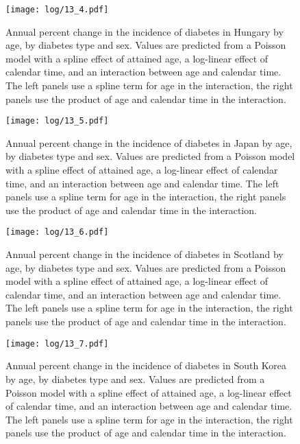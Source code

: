 \documentclass[11pt]{article}
\begin{document}
\begin{figure}
    \centering
    \texttt{[image: log/13\_4.pdf]}
    \caption{Annual percent change in the incidence of diabetes in Hungary by age, by diabetes type and sex. Values are predicted from a Poisson model with a spline effect of attained age, a log-linear effect of calendar time, and an interaction between age and calendar time. The left panels use a spline term for age in the interaction, the right panels use the product of age and calendar time in the interaction.}
    \label{Hungary apcageg}
\end{figure}
\begin{figure}
    \centering
    \texttt{[image: log/13\_5.pdf]}
    \caption{Annual percent change in the incidence of diabetes in Japan by age, by diabetes type and sex. Values are predicted from a Poisson model with a spline effect of attained age, a log-linear effect of calendar time, and an interaction between age and calendar time. The left panels use a spline term for age in the interaction, the right panels use the product of age and calendar time in the interaction.}
    \label{Japan apcageg}
\end{figure}
\begin{figure}
    \centering
    \texttt{[image: log/13\_6.pdf]}
    \caption{Annual percent change in the incidence of diabetes in Scotland by age, by diabetes type and sex. Values are predicted from a Poisson model with a spline effect of attained age, a log-linear effect of calendar time, and an interaction between age and calendar time. The left panels use a spline term for age in the interaction, the right panels use the product of age and calendar time in the interaction.}
    \label{Scotland apcageg}
\end{figure}
\begin{figure}
    \centering
    \texttt{[image: log/13\_7.pdf]}
    \caption{Annual percent change in the incidence of diabetes in South Korea by age, by diabetes type and sex. Values are predicted from a Poisson model with a spline effect of attained age, a log-linear effect of calendar time, and an interaction between age and calendar time. The left panels use a spline term for age in the interaction, the right panels use the product of age and calendar time in the interaction.}
    \label{South Korea apcageg}
\end{figure}
\begin{stlog}\end{stlog}
\color{black}

\clearpage

\end{document}
